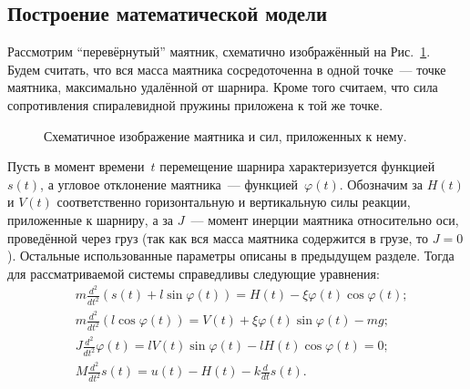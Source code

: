 \subsection{Построение математической модели}

Рассмотрим ``перевёрнутый'' маятник, схематично изображённый на Рис.~\ref{img:balance_picture}.
Будем считать, что вся масса маятника сосредоточенна в одной точке~--- точке маятника, максимально удалённой от шарнира.
Кроме того считаем, что сила сопротивления спиралевидной пружины приложена к той же точке.

\begin{figure}[h]
	\centering
	\begin{minipage}{0.45\linewidth}
		\centering
		
	\end{minipage}
	\begin{minipage}{0.45\linewidth}
		\centering
		
	\end{minipage}
	\caption{Схематичное изображение маятника и сил, приложенных к нему.}
	\label{img:balance_picture}
\end{figure}

Пусть в момент времени~$t$ перемещение шарнира характеризуется функцией $s(t)$, а угловое отклонение маятника~--- функцией~$\varphi(t)$.
Обозначим за $H(t)$ и $V(t)$ соответственно горизонтальную и вертикальную силы реакции, приложенные к шарниру, а за $J$~--- момент инерции маятника относительно оси, проведённой через груз (так как вся масса маятника содержится в грузе, то $J = 0$).
Остальные использованные параметры описаны в предыдущем разделе.
Тогда для рассматриваемой системы справедливы следующие уравнения:
\begin{equation} \label{eq:modeling_1}
	\begin{aligned}
& m \frac{d^2}{dt^2}(s(t) + l \sin\varphi(t)) = H(t) - \xi\varphi(t)\cos\varphi(t);
\\
& m \frac{d^2}{dt^2}(l \cos\varphi(t)) = V(t) + \xi\varphi(t)\sin\varphi(t) - mg;
\\
& J \frac{d^2}{dt^2}\varphi(t) = lV(t)\sin\varphi(t) - lH(t)\cos\varphi(t) = 0;
\\
& M\frac{d^2}{dt^2}s(t) = u(t) - H(t) - k\frac{d}{dt}s(t).
	\end{aligned}
\end{equation}

